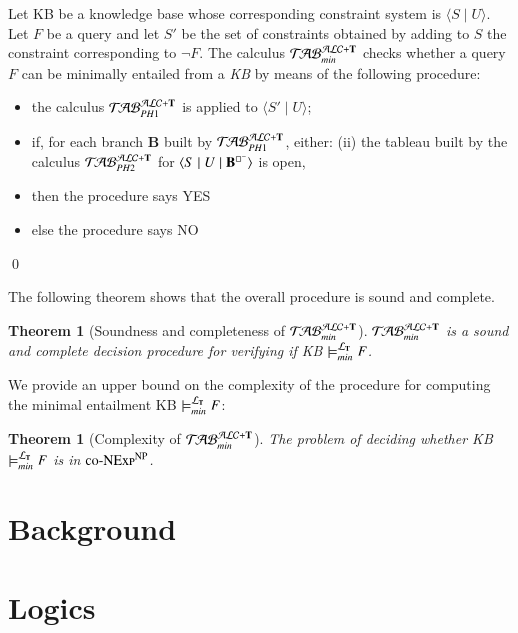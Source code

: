 \documentclass[a4paper, 11pt, oneside]{elsarticle}
\newcommand{\tip}{{\bf T}}
\newcommand{\nott} {\lnot}
\newcommand{\tc} {\mid}
\newcommand{\bbox}{\square}
\newcommand{\sx} {\langle}
\newcommand{\dx} {\rangle}
\newcommand{\ellet} {\mathcal{L}_{\bf T}}
\newcommand{\nuovoc}{\mathrel{{\mathcal{T}\!\mathcal{AB}}}_{min}^{\mathcal{ALC}+\mbox{\scriptsize $\tip$}}}
\newcommand{\primo}{\mathrel{{\mathcal{T}\!\mathcal{AB}}}_{PH 1}^{\mathcal{ALC}+\mbox{\scriptsize $\tip$}}}
\newcommand{\secondo}{\mathrel{{\mathcal{T}\!\mathcal{AB}}}_{PH 2}^{\mathcal{ALC}+\mbox{\scriptsize $\tip$}}}
\newenvironment{definition}
{\begin{defi} \rm}{\qed \end{defi}}
\newtheorem{theorem}{Theorem}
\newcounter{posu}
\newtheorem{theorem}[posu]{Theorem}
\newtheorem{definition}[posu]{Definition}
\begin{document}
\begin{definition}\label{def processo}
Let KB be a knowledge base whose corresponding constraint system is $\sx S \tc U \dx$. Let $F$ be a query and let $S'$ be the set of
constraints obtained by adding to $S$ the constraint corresponding to $\nott F$.
The calculus $\nuovoc$ checks whether a query $F$ can be minimally entailed from a \emph{KB} by means of the following procedure:
\begin{itemize}
\item the calculus $\primo$ is applied to $\sx S' \tc U
\dx$;  \item if, for each branch {\bf B} built by $\primo$,
either:  \subitem(ii) {the
tableau built by the calculus $\secondo$ for $\sx S \tc U \tc {\bf
B}^{\bbox^{-}} \dx$ is open, } \item[] then the procedure says \textsc{YES}
\item[] else the procedure says \textsc{NO}
\end{itemize}
\end{definition}

\noindent The following theorem shows that the overall procedure is sound
and complete.


\begin{theorem}[Soundness and completeness of $\nuovoc$]\label{Soundness e completeness nuovoc}
$\nuovoc$ is  a sound and complete decision procedure for
verifying if KB $\models_{min}^{\ellet} F$.
\end{theorem}

We provide an upper bound on the complexity of the
procedure for computing the minimal entailment KB
$\models_{min}^{\ellet} F$:

\begin{theorem}[Complexity of $\nuovoc$]\label{overall complexity}
The problem of deciding whether \emph{KB} $\models_{min}^{\ellet} F$ is
in $\textsc{co-NExp}^\textsc{NP}$.
\end{theorem}




\section{Background}
\section{Logics}
\end{document}
